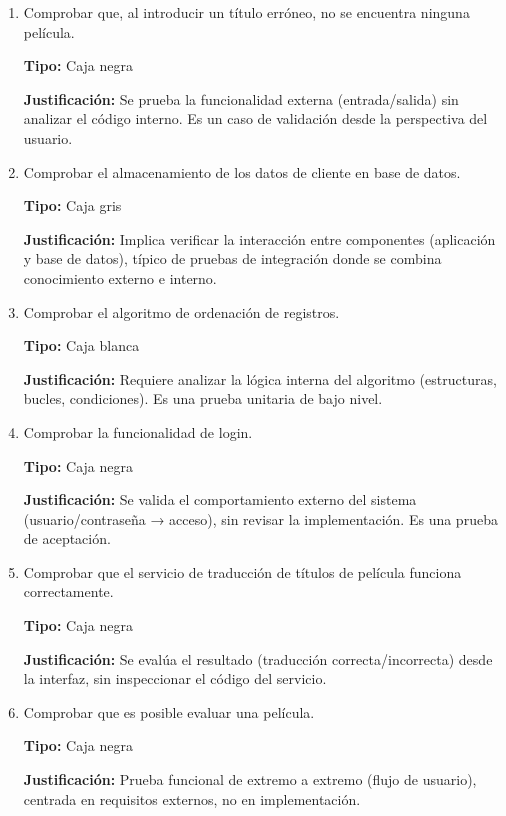 \begin{solucion}
    \begin{enumerate}
        \item Comprobar que, al introducir un título erróneo, no se encuentra ninguna película.

        \textbf{Tipo:} Caja negra

        \textbf{Justificación:} Se prueba la funcionalidad externa (entrada/salida) sin analizar el código interno.
        Es un caso de validación desde la perspectiva del usuario.

        \item Comprobar el almacenamiento de los datos de cliente en base de datos.

        \textbf{Tipo:} Caja gris

        \textbf{Justificación:} Implica verificar la interacción entre componentes (aplicación y base de datos), típico de pruebas de integración donde se combina conocimiento externo e interno.

        \item Comprobar el algoritmo de ordenación de registros.

        \textbf{Tipo:} Caja blanca

        \textbf{Justificación:} Requiere analizar la lógica interna del algoritmo (estructuras, bucles, condiciones).
        Es una prueba unitaria de bajo nivel.

        \item Comprobar la funcionalidad de login.

        \textbf{Tipo:} Caja negra

        \textbf{Justificación:} Se valida el comportamiento externo del sistema (usuario/contraseña → acceso), sin revisar la implementación.
        Es una prueba de aceptación.

        \item Comprobar que el servicio de traducción de títulos de película funciona correctamente.

        \textbf{Tipo:} Caja negra

        \textbf{Justificación:} Se evalúa el resultado (traducción correcta/incorrecta) desde la interfaz, sin inspeccionar el código del servicio.

        \item Comprobar que es posible evaluar una película.

        \textbf{Tipo:} Caja negra

        \textbf{Justificación:} Prueba funcional de extremo a extremo (flujo de usuario), centrada en requisitos externos, no en implementación.


\end{enumerate}
\end{solucion}
